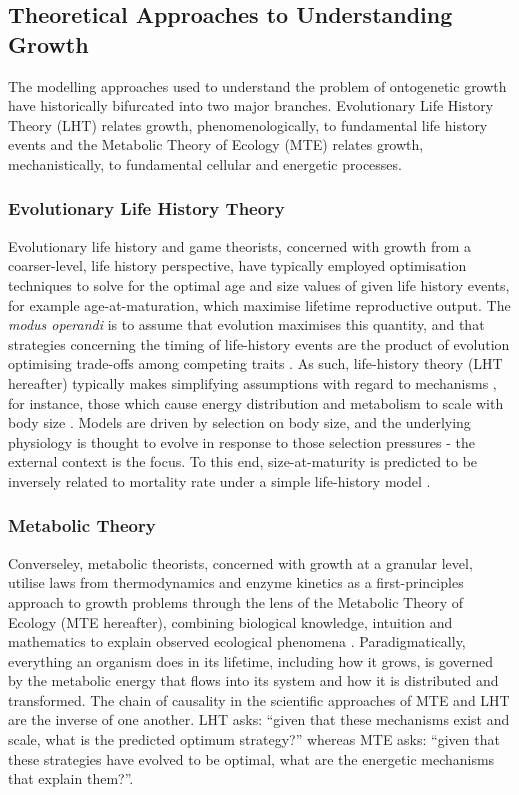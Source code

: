 \documentclass[a4paper]{article} %
\begin{document}
    \subsection{Theoretical Approaches to Understanding Growth}
        The modelling approaches used to understand the problem of ontogenetic growth have historically bifurcated into two major branches. Evolutionary Life History Theory (LHT) relates growth, phenomenologically, to fundamental life history events and the Metabolic Theory of Ecology (MTE) relates growth, mechanistically, to fundamental cellular and energetic processes.
        
        \subsubsection{Evolutionary Life History Theory}
        Evolutionary life history and game theorists, concerned with growth from a coarser-level, life history perspective, have typically employed optimisation techniques to solve for the optimal age and size values of given life history events, for example age-at-maturation, which maximise lifetime reproductive output. The \textit{modus operandi} is to assume that evolution maximises this quantity, and that strategies concerning the timing of life-history events are the product of evolution optimising trade-offs among competing traits \autocite{Day1997, Stearns1989, stearns1992evolution}. As such, life-history theory (LHT hereafter) typically makes simplifying assumptions with regard to mechanisms \autocite{Day1997, Kozowski1987-indeterminate}, for instance, those which cause energy distribution and metabolism to scale with body size \autocite{peters1983,Werner1988,brown2000-scaling-book}. Models are driven by selection on body size, and the underlying physiology is thought to evolve in response to those selection pressures - the external context is the focus. To this end, size-at-maturity is predicted to be inversely related to mortality rate under a simple life-history model \autocite{stearns1992evolution}.
        
        \subsubsection{Metabolic Theory}
        Converseley, metabolic theorists, concerned with growth at a granular level, utilise laws from thermodynamics and enzyme kinetics as a first-principles approach to growth problems through the lens of the Metabolic Theory of Ecology (MTE hereafter), combining biological knowledge, intuition and mathematics to explain observed ecological phenomena \autocite{Brown2004}. Paradigmatically, everything an organism does in its lifetime, including how it grows, is governed by the metabolic energy that flows into its system and how it is distributed and transformed. The chain of causality in the scientific approaches of MTE and LHT are the inverse of one another. LHT asks: ``given that these mechanisms exist and scale, what is the predicted optimum strategy?'' whereas MTE asks: ``given that these strategies have evolved to be optimal, what are the energetic mechanisms that explain them?''.
        
\end{document}
